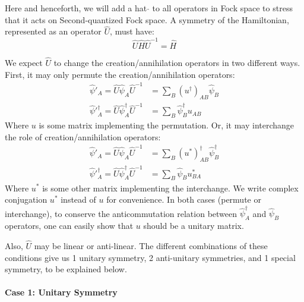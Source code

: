 \documentclass{article}
\begin{document}
Here and henceforth, we will add a hat $\hat{}$ to all operators in Fock space
to stress that it acts on Second-quantized Fock space.  A symmetry of the
Hamiltonian, represented as an operator $\hat{U}$, must have:
\begin{equation}
    \label{eq:sym-in-2nd-1}
    \hat{U}\hat{H}\hat{U}^{-1} = \hat{H}
\end{equation}

We expect $\hat{U}$ to change the creation/annihilation operators in two different
ways. First, it may only permute the creation/annihilation operators:
\begin{subequations}
\label{eq:sym-in-2nd-permute}
\begin{align}
    \label{eq:sym-in-2nd-permute-1}
    \hat{\psi}'_A = 
    \hat{U} \hat\psi_A \hat{U}^{-1} &=
    \sum_B (u^\dagger)_{AB} \hat\psi_B \\
    \label{eq:sym-in-2nd-permute-2}
    \hat\psi'^\dagger_A =
    \hat{U} \hat\psi^\dagger_A \hat{U}^{-1} &= 
    \sum_B  \hat\psi^\dagger_B u_{AB}
\end{align}
\end{subequations}
Where $u$ is some matrix implementing the permutation.
Or, it may interchange the role of creation/annihilation operators:
\begin{subequations}
\label{eq:sym-cc}
\begin{align}
    \label{eq:sym-cc-1}
    \hat{\psi}'_A = 
    \hat{U} \hat\psi_A \hat{U}^{-1} &=
    \sum_B (u^*)^\dagger_{AB} \hat\psi^\dagger_B \\
    \label{eq:sym-cc-2}
    \hat\psi'^\dagger_A =
    \hat{U} \hat\psi^\dagger_A \hat{U}^{-1} &= 
    \sum_B  \hat\psi_B u^*_{BA}
\end{align}
\end{subequations}
Where $u^*$ is some other matrix implementing the interchange. We write complex
conjugation $u^*$ instead of $u$ for convenience. In both cases (permute or
interchange), to conserve the anticommutation relation between
$\hat\psi^\dagger_A$ and $\hat\psi_B$ operators, one can easily show that $u$
should be a unitary matrix.

Also, $\hat{U}$ may be linear or anti-linear. The different combinations of these
conditions give us 1 unitary symmetry, 2 anti-unitary symmetries, and 1 special
symmetry, to be explained below.

\paragraph{Case 1: Unitary Symmetry}
\end{document}
